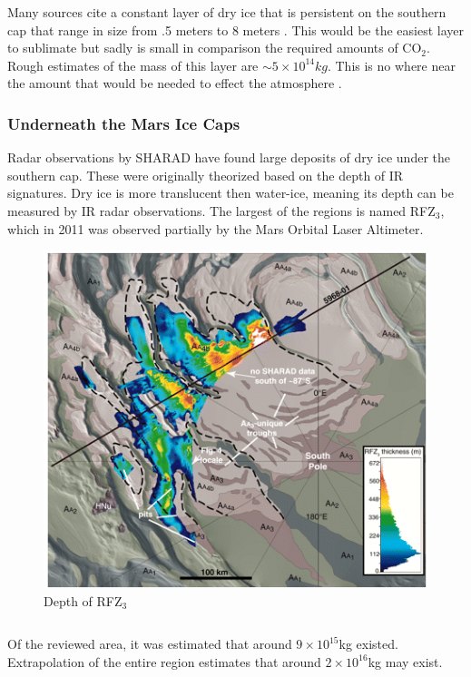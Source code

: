 \documentclass[a4paper]{article}
\begin{document}
    Many sources cite a constant layer of dry ice that is persistent on the southern cap that range in size from .5 meters to 8 meters \cite{david_darling_polar_????}. This would be the easiest layer to sublimate but sadly is small in comparison the required amounts of CO$_2$. Rough estimates of the mass of this layer are $\sim 5 \times 10^{14} kg$. This is no where near the amount that would be needed to effect the atmosphere \cite{stephen_j._mackwell_comparative_2014}.
    
    \subsubsection{Underneath the Mars Ice Caps}
    
    Radar observations by SHARAD have found large deposits of dry ice under the southern cap. These were originally theorized based on the depth of IR signatures. Dry ice is more translucent then water-ice, meaning its depth can be measured by IR radar observations. The largest of the regions is named RFZ$_3$, which in 2011 was observed partially by the Mars Orbital Laser Altimeter\cite{roger_j._phillips_massive_2011}.
    
     \begin{figure}[h]
		\centering
		\includegraphics[]{Cool1.PNG}
		\caption{Depth of RFZ$_3$\cite{roger_j._phillips_massive_2011}}
	\end{figure} \[\]
    
    Of the reviewed area, it was estimated that around $9 \times 10^{15}$kg existed. Extrapolation of the entire region estimates that around $2 \times 10^{16}$kg may exist\cite{roger_j._phillips_massive_2011}.
    
\end{document}
